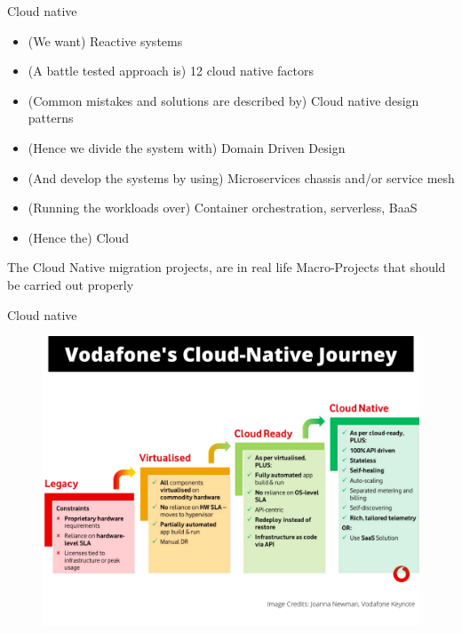 \documentclass[aspectratio=169]{beamer}
\begin{document}
\begin{frame}{Cloud native}

	\begin{itemize}
        		\item (We want) Reactive systems
        		\item (A battle tested approach is) 12 cloud native factors
                \item (Common mistakes and solutions are described by) Cloud native design patterns
                \item (Hence we divide the system with) Domain Driven Design
        		\item (And develop the systems by using) Microservices chassis and/or service mesh
                \item (Running the workloads over) Container orchestration, serverless, BaaS
                \item (Hence the) Cloud
	\end{itemize}

The Cloud Native migration projects, are in real life Macro-Projects that should be carried out properly

\end{frame}

\begin{frame}{Cloud native}

\begin{figure}
\centering
\includegraphics[width=0.6\linewidth]{Images/vodaphone}
\end{figure}
\end{frame}
\end{document}
